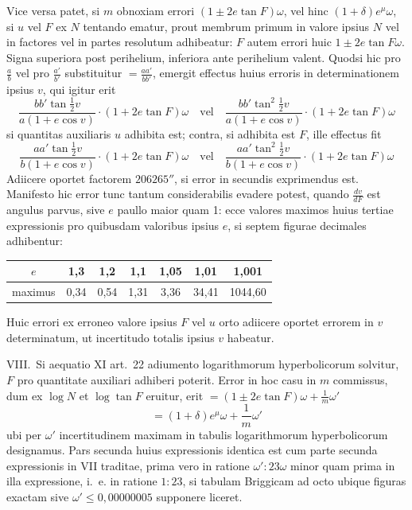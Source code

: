 \documentclass[12pt,a4paper]{article}
\begin{document}
Vice versa patet, si $m$ obnoxiam errori $(1 \pm 2e \tan F)\omega$, vel hinc $(1 + \delta)e^{\mu}\omega$, si $u$ vel $F$ ex $N$ tentando ematur, prout membrum primum in valore ipsius $N$ vel in factores vel in partes resolutum adhibeatur: $F$ autem errori huic $1 \pm 2e \tan F\omega$. Signa superiora post perihelium, inferiora ante perihelium valent. Quodsi hic pro $\frac{a}{b}$ vel pro $\frac{a'}{b'}$ substituitur $= \frac{aa'}{bb'}$, emergit effectus huius erroris in determinationem ipsius $v$, qui igitur erit
\[
\frac{bb' \tan \frac{1}{2}v}{a(1+e \cos v)} \cdot (1 + 2e \tan F)\omega \quad\text{vel}\quad \frac{bb' \tan^2 \frac{1}{2}v}{a(1+e \cos v)} \cdot (1 + 2e \tan F)\omega
\]
si quantitas auxiliaris $u$ adhibita est; contra, si adhibita est $F$, ille effectus fit
\[
\frac{aa' \tan \frac{1}{2}v}{b(1+e \cos v)} \cdot (1 + 2e \tan F)\omega \quad\text{vel}\quad \frac{aa' \tan^2 \frac{1}{2}v}{b(1+e \cos v)} \cdot (1 + 2e \tan F)\omega
\]
Adiicere oportet factorem $206265''$, si error in secundis exprimendus est. Manifesto hic error tunc tantum considerabilis evadere potest, quando $\frac{dv}{dF}$ est angulus parvus, sive $e$ paullo maior quam 1: ecce valores maximos huius tertiae expressionis pro quibusdam valoribus ipsius $e$, si septem figurae decimales adhibentur:

\begin{center}
\begin{tabular}{c|c|c|c|c|c|c}
$e$ & 1,3 & 1,2 & 1,1 & 1,05 & 1,01 & 1,001 \\
\hline
maximus & 0,34 & 0,54 & 1,31 & 3,36 & 34,41 & 1044,60 \\
\end{tabular}
\end{center}

Huic errori ex erroneo valore ipsius $F$ vel $u$ orto adiicere oportet errorem in $v$ determinatum, ut incertitudo totalis ipsius $v$ habeatur.

VIII.~Si aequatio XI art.~22 adiumento logarithmorum hyperbolicorum solvitur, $F$ pro quantitate auxiliari adhiberi poterit. Error in hoc casu in $m$ commissus, dum ex $\log N$ et $\log \tan F$ eruitur, erit $= (1 \pm 2e \tan F)\omega + \frac{1}{m}\omega'$
\[
= (1 + \delta)e^{\mu}\omega + \frac{1}{m}\omega'
\]
ubi per $\omega'$ incertitudinem maximam in tabulis logarithmorum hyperbolicorum designamus. Pars secunda huius expressionis identica est cum parte secunda expressionis in VII traditae, prima vero in ratione $\omega' : 23\omega$ minor quam prima in illa expressione, i.~e. in ratione $1 : 23$, si tabulam Briggicam ad octo ubique figuras exactam sive $\omega' \leq 0{,}00000005$ supponere liceret.
\end{document}
